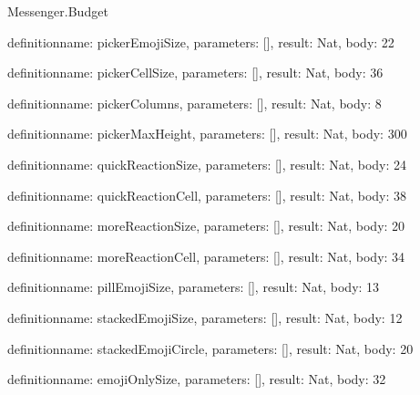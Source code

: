\begin{lexlean}{Messenger.Budget}
\begin{semanticmodule}
definition{name: pickerEmojiSize, parameters: [], result: Nat, body: 22}

definition{name: pickerCellSize, parameters: [], result: Nat, body: 36}

definition{name: pickerColumns, parameters: [], result: Nat, body: 8}

definition{name: pickerMaxHeight, parameters: [], result: Nat, body: 300}

definition{name: quickReactionSize, parameters: [], result: Nat, body: 24}

definition{name: quickReactionCell, parameters: [], result: Nat, body: 38}

definition{name: moreReactionSize, parameters: [], result: Nat, body: 20}

definition{name: moreReactionCell, parameters: [], result: Nat, body: 34}

definition{name: pillEmojiSize, parameters: [], result: Nat, body: 13}

definition{name: stackedEmojiSize, parameters: [], result: Nat, body: 12}

definition{name: stackedEmojiCircle, parameters: [], result: Nat, body: 20}

definition{name: emojiOnlySize, parameters: [], result: Nat, body: 32}
\end{semanticmodule}
\end{lexlean}
